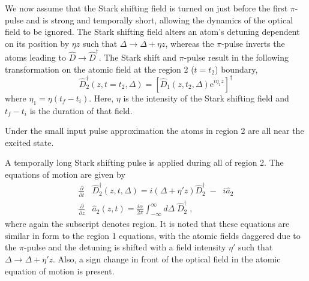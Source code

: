 \documentclass[superscriptaddress,pra,twocolumn,showpacs,amsmath,amssymb,aps,a4paper]{revtex4}
\begin{document}
We now assume that the Stark shifting field is turned on just before
the first $\pi$-pulse and is strong and temporally short, allowing the
dynamics of the optical field to be ignored. The Stark shifting field
alters an atom's detuning dependent on its position by $\eta z$ such
that $\Delta \to \Delta + \eta z$, whereas the $\pi$-pulse inverts the
atoms leading to $\hat{D} \to \hat{D}^\dagger$. The Stark
shift and $\pi$-pulse result in the following transformation on the
atomic field at the region 2 ($t = t_2$) boundary,
\begin{equation}
\hat{D}^{\dagger}_2(z,t = t_2,\Delta) = \left[ \hat{D}_1(z,t_2,\Delta) \text{e}^{i\eta_1z} \right]^{\dagger}
\end{equation}
where $\eta_1 = \eta (t_f -t_i)$. Here, $\eta$ is the intensity of the Stark shifting field and $t_f - t_i$ is the duration of that field.

Under the small input pulse approximation the atoms in region 2 are
all near the excited state.

 A temporally long Stark shifting pulse is applied during all of
 region 2. The equations of motion are given by
\begin{subequations}
 \label{equ:excitedMBE}
 \begin{align}
  \label{equ:MBE1R2}
  \frac{\partial}{\partial t} & \hat{D}_{2}^{\dagger}(z,t,\Delta) = i (\Delta + \eta' z) \hat{D}_{2}^{\dagger} \; -  \;\; i \hat{a}_{2} \\
  \label{equ:MBE2R2}
  \frac{\partial}{\partial z} & \hat{a}_{2}(z,t) = \frac{i \alpha}{2 \pi} \int_{-\infty}^{\infty} d\Delta \;   \hat{D}_{2}^{\dagger} \;,
 \end{align}
 \end{subequations}
 where again the subscript denotes region. It is noted that these equations are similar in form to the region 1 equations, with the atomic fields daggered due to the $\pi$-pulse and the detuning is shifted with a field intensity $\eta'$ such that $\Delta \to \Delta + \eta' z$. Also, a sign change in front of the optical field in the atomic equation of motion is present.
 
\end{document}
